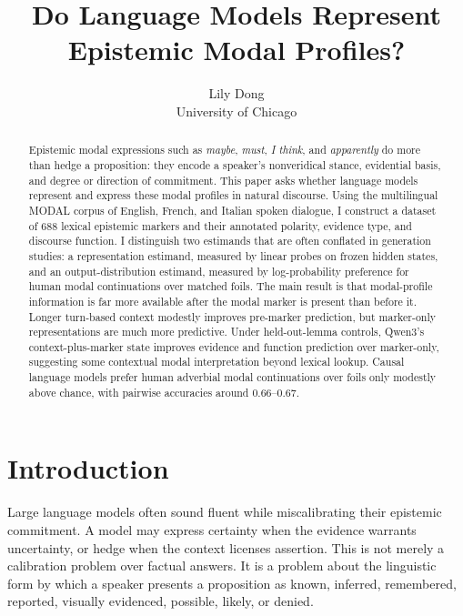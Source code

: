\documentclass{article}
\title{Do Language Models Represent Epistemic Modal Profiles?}
\date{}
\author{Lily Dong\\University of Chicago}
\begin{document}
\maketitle

\begin{abstract}
Epistemic modal expressions such as \emph{maybe}, \emph{must}, \emph{I think}, and \emph{apparently} do more than hedge a proposition: they encode a speaker's nonveridical stance, evidential basis, and degree or direction of commitment. This paper asks whether language models represent and express these modal profiles in natural discourse. Using the multilingual MODAL corpus of English, French, and Italian spoken dialogue, I construct a dataset of 688 lexical epistemic markers and their annotated polarity, evidence type, and discourse function. I distinguish two estimands that are often conflated in generation studies: a representation estimand, measured by linear probes on frozen hidden states, and an output-distribution estimand, measured by log-probability preference for human modal continuations over matched foils. The main result is that modal-profile information is far more available after the modal marker is present than before it. Longer turn-based context modestly improves pre-marker prediction, but marker-only representations are much more predictive. Under held-out-lemma controls, Qwen3's context-plus-marker state improves evidence and function prediction over marker-only, suggesting some contextual modal interpretation beyond lexical lookup. Causal language models prefer human adverbial modal continuations over foils only modestly above chance, with pairwise accuracies around 0.66--0.67.
\end{abstract}

\section{Introduction}

Large language models often sound fluent while miscalibrating their epistemic commitment. A model may express certainty when the evidence warrants uncertainty, or hedge when the context licenses assertion. This is not merely a calibration problem over factual answers. It is a problem about the linguistic form by which a speaker presents a proposition as known, inferred, remembered, reported, visually evidenced, possible, likely, or denied.
\end{document}
